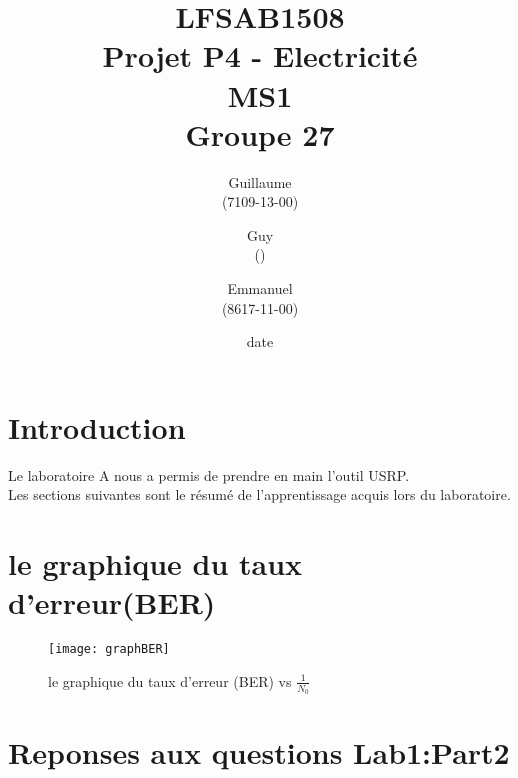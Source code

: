 \documentclass[11pt]{article}
\title{\textbf{LFSAB1508\\ Projet P4 - Electricité \\ MS1} \\ {\large Groupe 27}}
\author{Guillaume \bsc{Lamine} \\(7109-13-00) \and Guy \bsc{Mavungu Zola Lutete} \\()  \and Emmanuel \bsc{Dushimimana} \\ (8617-11-00)}
\date{date}
\date{\vspace*{25mm}
\texttt{[image: logo.jpg]}\\
		\vspace*{30mm} 
		\begin{center}
		Année académique 2015-2016 \\	
		\end{center}}
\begin{document}
\thispagestyle{empty}

\maketitle
\thispagestyle{empty}

\setcounter{tocdepth}{3}
\setcounter{page}{1}
\newpage

\section*{Introduction}
Le laboratoire A nous a permis de prendre en main l'outil USRP. \\ Les sections suivantes sont le résumé de l'apprentissage acquis lors du laboratoire.
\section{le graphique du taux d'erreur(BER)}
 \begin{figure}[!h]
     \centering
     \texttt{[image: graphBER]}
     \caption{le graphique du taux d'erreur (BER) vs $\frac{1}{N_0}$}
     \label{ber}
 \end{figure}
\section{}
\section{Reponses aux questions Lab1:Part2}
\subsection{}
\end{document}
